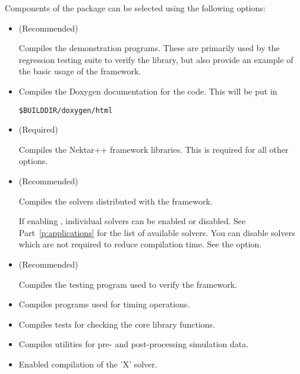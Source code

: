 Components of the \nekpp package can be selected using the following options:
\begin{itemize}
    \item {} (Recommended)

    Compiles the demonstration programs. These are primarily used by the
    regression testing suite to verify the \nekpp library, but also provide an
    example of the basic usage of the framework.

    \item {}

    Compiles the Doxygen documentation for the code. This will be put in
    \begin{lstlisting}[style=BashInputStyle]
    $BUILDDIR/doxygen/html
    \end{lstlisting}

    \item {} (Required)

    Compiles the Nektar++ framework libraries. This is required for all other
    options.

    \item {} (Recommended)

    Compiles the solvers distributed with the \nekpp framework.

    If enabling , individual solvers can be
    enabled or disabled. See Part~\ref{p:applications} for the list of available
    solvers. You can disable solvers which are not required to reduce
    compilation time. See the  option.

    \item {} (Recommended)

    Compiles the testing program used to verify the \nekpp framework.

    \item {}

    Compiles programs used for timing \nekpp operations.

    \item {}

    Compiles tests for checking the core library functions.

    \item {}

    Compiles utilities for pre- and post-processing simulation data.

    \item {}

    Enabled compilation of the 'X' solver.
\end{itemize}

